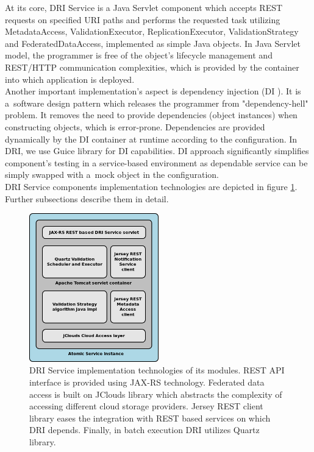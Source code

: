 At its core, DRI Service is a Java Servlet \cite{java-servlet}
component which accepts REST requests on specified URI paths and performs the
requested task utilizing MetadataAccess, ValidationExecutor, 
ReplicationExecutor, ValidationStrategy and FederatedDataAccess, implemented as
simple Java objects. In Java Servlet model, the programmer is free of the
object's lifecycle management and REST/HTTP communication complexities, which
is provided by the container into which application is deployed.\\

Another important implementation's aspect is dependency injection (DI \cite{di,di-book}). It is
a~software design pattern which releases the programmer from "dependency-hell"
problem. It removes the need to provide dependencies (object instances) when
constructing objects, which is error-prone. Dependencies are provided
dynamically by the DI container at runtime according to the configuration.
In DRI, we use Guice library \cite{guice} for DI capabilities. DI approach
significantly simplifies component's testing in a service-based environment as
dependable service can be simply swapped with a~mock object in the
configuration.\\

DRI Service components implementation technologies are depicted in figure
\ref{fig:dri-impl-technologies}. Further subsections describe them in detail.

\begin{figure}[h!]
	\centering
	\includegraphics[width=0.5\textwidth]{images/dri-impl-technologies.png}
	\caption{DRI Service implementation technologies of its modules. REST API
	interface is provided using JAX-RS technology. Federated data access is built
	on JClouds library which abstracts the complexity of accessing different cloud
	storage providers. Jersey REST client library eases the integration with REST
	based services on which DRI depends. Finally, in batch execution DRI utilizes
	Quartz library.}
	\label{fig:dri-impl-technologies}
\end{figure}
 
